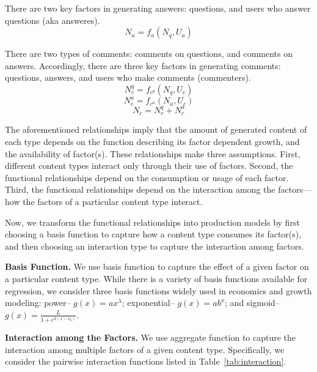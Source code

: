 There are two key factors in generating answers: questions, and users who answer questions (aka answeres). 
\begin{equation*}
N_a = f_a(N_q, U_a)
\end{equation*}

There are two types of comments: comments on questions, and comments on answers. Accordingly, there are three key factors in generating comments: questions, answers, and users who make comments (commenters). 
\begin{equation*}
N_c^q = f_{c^q}(N_q, U_c)
\end{equation*}
\begin{equation*}
N_c^a = f_{c^a}(N_a, U_c)
\end{equation*}
\begin{equation*}
N_c = N_c^q + N_c^a
\end{equation*}

The aforementioned relationships imply that the amount of generated content of each type depends on the function describing its factor dependent growth, and the availability of factor(s). These relationships make three assumptions. First, different content types interact only through their use of factors. Second, the functional relationships depend on the consumption or usage of each factor. Third, the functional relationships depend on the interaction among the factors---how the factors of a particular content type interact. 

Now, we transform the functional relationships into production models by first choosing a basis function to capture how a content type consumes its factor(s), and then choosing an interaction type to capture the interaction among factors.

\textbf{Basis Function.} We use basis function to capture the effect of a given factor on a particular content type. While there is a variety of basis functions available for regression, we consider three basis functions widely used in economics and growth modeling: power-- $g(x) = ax^{\lambda}$; exponential-- $g(x) = ab^x$; and sigmoid-- $g(x) = \frac{L}{1+e^{k(x-x_0)}}$. 

\textbf{Interaction among the Factors.} We use aggregate function to capture the interaction among multiple factors of a given content type. Specifically, we consider the pairwise interaction functions listed in Table~\ref{tab:interaction}. 

